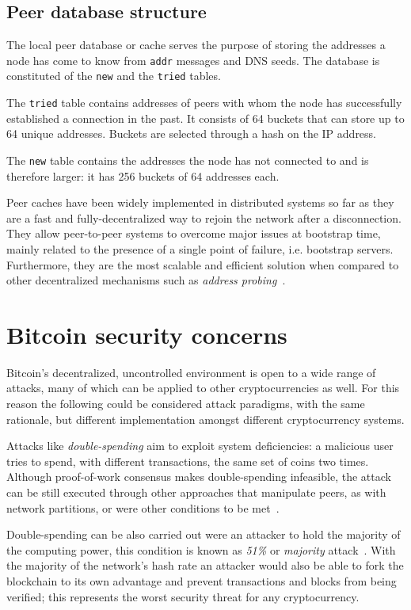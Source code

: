 \documentclass[12pt, letterpaper, twoside]{article}
\begin{document}
\subsection{Peer database structure}\label{cachestruct}
The local peer database or cache serves the purpose of storing the addresses a node has come to know from \texttt{addr} messages and DNS seeds. The database is constituted of the \texttt{new} and the \texttt{tried} tables.

The \texttt{tried} table contains addresses of peers with whom the node has successfully established a connection in the past. It consists of 64 buckets that can store up to 64 unique addresses. Buckets are selected through a hash on the IP address.

The \texttt{new} table contains the addresses the node has not connected to and is therefore larger: it has 256 buckets of 64 addresses each.

Peer caches have been widely implemented in distributed systems so far as they are a fast and fully-decentralized way to rejoin the network after a disconnection. They allow peer-to-peer systems to overcome major issues at bootstrap time, mainly related to the presence of a single point of failure, i.e. bootstrap servers. Furthermore, they are the most scalable and efficient solution when compared to other decentralized mechanisms such as \textit{address probing}~\cite{decentrbootstrapp2p}.

\section{Bitcoin security concerns}\label{securityintro}
Bitcoin's decentralized, uncontrolled environment is open to a wide range of attacks, many of which can be applied to other cryptocurrencies as well. For this reason the following could be considered attack paradigms, with the same rationale, but different implementation amongst different cryptocurrency systems.

Attacks like \textit{double-spending} aim to exploit system deficiencies: a malicious user tries to spend, with different transactions, the same set of coins two times. Although proof-of-work consensus makes double-spending infeasible, the attack can be still executed through other approaches that manipulate peers, as with network partitions, or were other conditions to be met~\cite{doublespendfastpay}.

Double-spending can be also carried out were an attacker to hold the majority of the computing power, this condition is known as \textit{51\%} or \textit{majority} attack~\cite{51atk}. With the majority of the network's hash rate an attacker would also be able to fork the blockchain to its own advantage and prevent transactions and blocks from being verified; this represents the worst security threat for any cryptocurrency.
\end{document}
